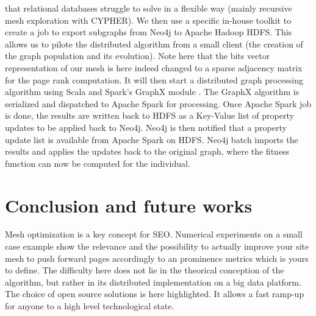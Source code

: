\documentclass{iSWAGArticle}
\begin{document}
  that relational databases struggle to solve in a flexible way (mainly recursive mesh exploration with CYPHER). 
  We then use a specific in-house toolkit to create a job to export subgraphs from Neo4j to Apache Hadoop HDFS.
  This allows us to pilote the distributed algorithm from a small client (the creation of the graph population and its evolution). Note here that
  the bits vector representation of our mesh is here indeed changed to a sparse adjacency matrix for the page rank computation.
  It will then start a distributed graph processing algorithm using Scala \cite{scala} and Spark's GraphX module \cite{graphX}. 
  The GraphX algorithm is serialized and dispatched to Apache Spark for processing.
  Once Apache Spark job is done, the results are written back to HDFS as a Key-Value list of property updates to be applied back to Neo4j.
  Neo4j is then notified that a property update list is available from Apache Spark on HDFS. Neo4j batch imports the results and applies the updates back to the original graph,
  where the fitness function can now be computed for the individual.
  \section{Conclusion and future works}
  Mesh optimization is a key concept for SEO. Numerical experiments on a small case example show the relevance and the possibility to actually improve your site mesh
  to push forward pages accordingly to an prominence metrics which is yours to define. The difficulty here does not lie in the
  theorical conception of the algorithm, but rather in its distributed implementation on a big data platform. The choice of open source solutions
  is here highlighted. It allows a fast ramp-up for anyone to a high level technological state.
  \nocite{*}
  
  
  
\end{document}
